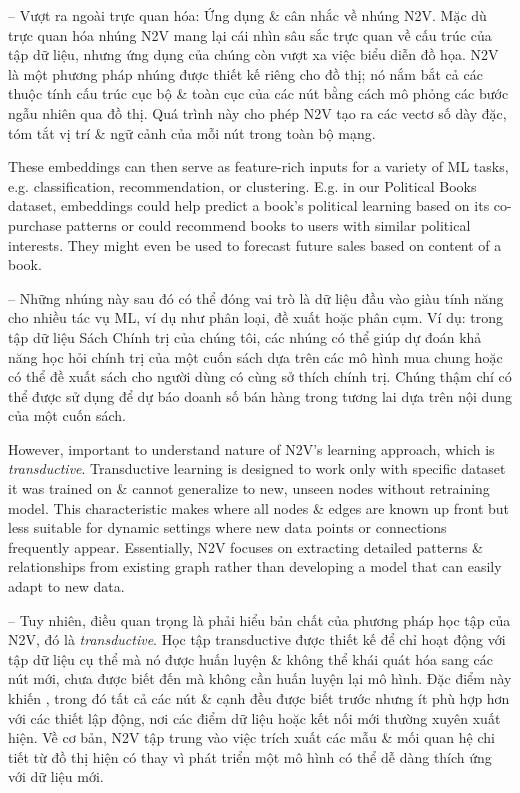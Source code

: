 \documentclass{article}
\begin{document}
\begin{itemize}
\begin{itemize}
\begin{itemize}
           -- {\sf Vượt ra ngoài trực quan hóa: Ứng dụng \& cân nhắc về nhúng N2V.} Mặc dù trực quan hóa nhúng N2V mang lại cái nhìn sâu sắc trực quan về cấu trúc của tập dữ liệu, nhưng ứng dụng của chúng còn vượt xa việc biểu diễn đồ họa. N2V là một phương pháp nhúng được thiết kế riêng cho đồ thị; nó nắm bắt cả các thuộc tính cấu trúc cục bộ \& toàn cục của các nút bằng cách mô phỏng các bước ngẫu nhiên qua đồ thị. Quá trình này cho phép N2V tạo ra các vectơ số dày đặc, tóm tắt vị trí \& ngữ cảnh của mỗi nút trong toàn bộ mạng.

           These embeddings can then serve as feature-rich inputs for a variety of ML tasks, e.g. classification, recommendation, or clustering. E.g. in our Political Books dataset, embeddings could help predict a book's political learning based on its co-purchase patterns or could recommend books to users with similar political interests. They might even be used to forecast future sales based on content of a book.

           -- Những nhúng này sau đó có thể đóng vai trò là dữ liệu đầu vào giàu tính năng cho nhiều tác vụ ML, ví dụ như phân loại, đề xuất hoặc phân cụm. Ví dụ: trong tập dữ liệu Sách Chính trị của chúng tôi, các nhúng có thể giúp dự đoán khả năng học hỏi chính trị của một cuốn sách dựa trên các mô hình mua chung hoặc có thể đề xuất sách cho người dùng có cùng sở thích chính trị. Chúng thậm chí có thể được sử dụng để dự báo doanh số bán hàng trong tương lai dựa trên nội dung của một cuốn sách.

           However, important to understand nature of N2V's learning approach, which is {\it transductive}. Transductive learning is designed to work only with specific dataset it was trained on \& cannot generalize to new, unseen nodes without retraining model. This characteristic makes  where all nodes \& edges are known up front but less suitable for dynamic settings where new data points or connections frequently appear. Essentially, N2V focuses on extracting detailed patterns \& relationships from existing graph rather than developing a model that can easily adapt to new data.

           -- Tuy nhiên, điều quan trọng là phải hiểu bản chất của phương pháp học tập của N2V, đó là {\it transductive}. Học tập transductive được thiết kế để chỉ hoạt động với tập dữ liệu cụ thể mà nó được huấn luyện \& không thể khái quát hóa sang các nút mới, chưa được biết đến mà không cần huấn luyện lại mô hình. Đặc điểm này khiến , trong đó tất cả các nút \& cạnh đều được biết trước nhưng ít phù hợp hơn với các thiết lập động, nơi các điểm dữ liệu hoặc kết nối mới thường xuyên xuất hiện. Về cơ bản, N2V tập trung vào việc trích xuất các mẫu \& mối quan hệ chi tiết từ đồ thị hiện có thay vì phát triển một mô hình có thể dễ dàng thích ứng với dữ liệu mới.


\end{itemize}
\end{itemize}
\end{itemize}
\end{document}
